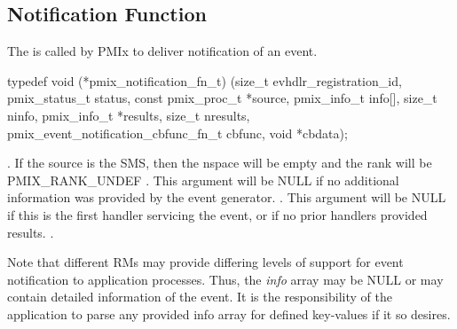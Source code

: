 \subsection{Notification Function}

\summary

The  is called by \ac{PMIx} to deliver notification of an event.

\cspecificstart
\begin{codepar}
typedef void (*pmix_notification_fn_t)
    (size_t evhdlr_registration_id,
     pmix_status_t status,
     const pmix_proc_t *source,
     pmix_info_t info[], size_t ninfo,
     pmix_info_t *results, size_t nresults,
     pmix_event_notification_cbfunc_fn_t cbfunc,
     void *cbdata);
\end{codepar}
\cspecificend

\begin{arglist}
. If the source is the \ac{SMS}, then the nspace will be empty and the rank will be PMIX_RANK_UNDEF
. This argument will be NULL if no additional information was provided by the event generator.
. This argument will be NULL if this is the first handler servicing the event, or if no prior handlers provided results.
.
\end{arglist}

\descr

Note that different \acp{RM} may provide differing levels of support for event notification to application processes. Thus, the \textit{info} array may be NULL or may contain detailed information of the event. It is the responsibility of the application to parse any provided info array for defined key-values if it so desires.

